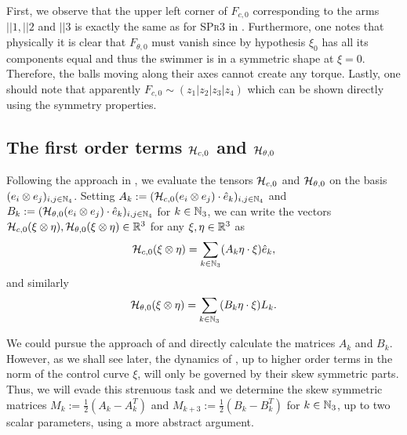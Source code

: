 \begin{remark}
First, we observe that the upper left corner of $F_{c,0}$ corresponding to the arms $||1, ||2$ and $||3$ is exactly the same as for \textsc{SPr3} in \cite{Alouges2017}. Furthermore, one notes that physically it is  clear that $F_{\theta,0}$ must vanish since by hypothesis $\xi_0$ has all its components equal and thus the swimmer is in a symmetric shape at $\xi = 0$. Therefore, the balls moving along their axes cannot create any torque. Lastly, one should note that apparently $F_{c,0} \sim (z_1 |z_2|z_3|z_4)$ which can be shown directly using the symmetry properties.
\end{remark}

\subsection{The first order terms $\mathcal{H}_{c,0}$ and $\mathcal{H}_{\theta,0}$}
Following the approach in \cite{Alouges2017}, we evaluate the tensors $\mathcal{H}_{c,0}$ and $\mathcal{H}_{\theta,0}$ on the basis $(e_{i} \otimes e_{j})_{i,j \in \mathbb{N}_4}$. Setting $A_k := (\mathcal{H}_{c,0}(e_i \otimes e_j)\cdot \hat{e}_k)_{i,j \in \mathbb{N}_4}$ and $B_k:= (\mathcal{H}_{\theta,0}(e_i \otimes e_j)\cdot \hat{e}_k)_{i,j \in \mathbb{N}_4}$ for $k \in \mathbb{N}_3$, we can write the vectors $\mathcal{H}_{c,0}(\xi \otimes \eta), \mathcal{H}_{\theta,0}(\xi \otimes \eta) \in \mathbb{R}^3$ for any $\xi, \eta \in \mathbb{R}^3$ as
\begin{equation}
\label{eq: matrix representation of spatial first order term}
	\mathcal{H}_{c,0}(\xi \otimes \eta) = \sum_{k \in \mathbb{N}_3}(A_k \eta \cdot \xi)\hat{e}_k, 
\end{equation}
and similarly
\begin{equation}
\label{eq: matrix representation of angular first order term}
	\mathcal{H}_{\theta, 0}(\xi \otimes \eta) = \sum_{k \in \mathbb{N}_3}(B_k \eta \cdot \xi) L_k.
\end{equation}

We could pursue the approach of \cite{Alouges2017} and directly calculate the matrices $A_k$ and $B_k$. However, as we shall see later, the dynamics of \spr, up to higher order terms in the norm of the control curve $\xi$, will only be governed by their skew symmetric parts. Thus, we will evade this strenuous task and we determine the skew symmetric matrices $M_k := \tfrac{1}{2}(A_k - A_k^T)$ and $M_{k + 3}:= \tfrac{1}{2}(B_k - B_k^T)$ for $k \in \mathbb{N}_3$, up to two scalar parameters, using a more abstract argument.


